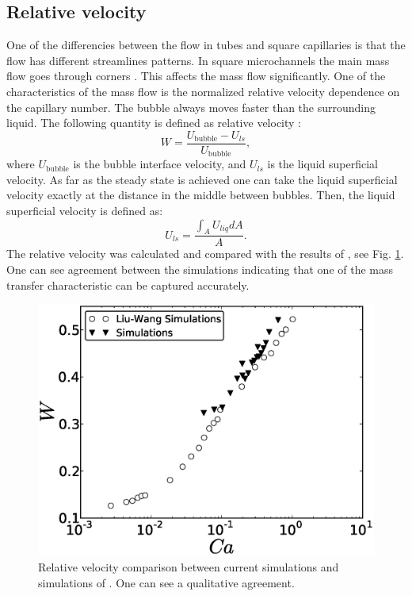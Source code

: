 \documentclass{article}
\begin{document}
\subsection{Relative velocity}
One of the differencies between the flow in tubes and square capillaries is that the flow has
different streamlines patterns. In square microchannels the main mass flow goes through corners
\cite{heil-threedim,wang-non-circular}. This affects the mass flow significantly. One of the
characteristics of the mass flow is the normalized relative velocity dependence on the capillary
number. The bubble always moves faster than the surrounding liquid. The following quantity is
defined as
relative velocity \cite{cerro-bubble-train}:
\begin{equation}
W=\frac{U_{\mathrm{bubble}}-U_{ls}}{U_{\mathrm{bubble}}},
\end{equation}
where $U_{\mathrm{bubble}}$ is the bubble interface velocity, and $U_{ls}$ is the liquid superficial
velocity. As far as the steady state is achieved one can take the liquid superficial velocity
exactly at the distance in the middle between bubbles. Then, the liquid superficial velocity is
defined as:
\begin{equation}
U_{ls}=\frac{\int_{A}{U_{liq}dA}}{A}.
\end{equation}
The relative velocity was calculated and compared with the results of \citet{wang-non-circular},
see Fig. \ref{fig:relative:velocity}. One can see agreement between the simulations indicating that
one of the mass transfer characteristic can be captured accurately. 
\begin{figure}[ht]
\includegraphics[width=\textwidth]{Figures/relative_velocity.eps}
\caption{Relative velocity comparison between current simulations and simulations of
\citet{wang-non-circular}. One can see a qualitative agreement. \label{fig:relative:velocity}}
\end{figure}
\end{document}

